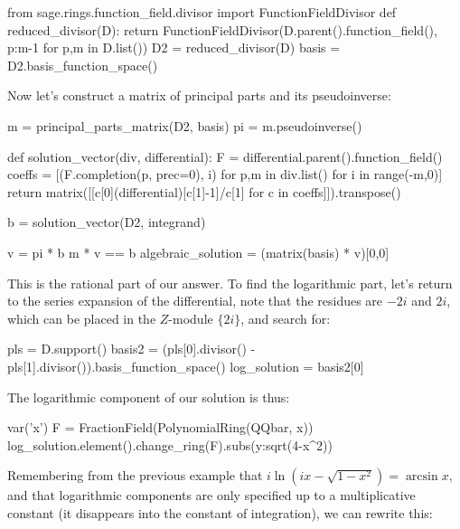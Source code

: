 \begin{sageblock}[ex8.7]
from sage.rings.function_field.divisor import FunctionFieldDivisor
def reduced_divisor(D):
    return FunctionFieldDivisor(D.parent().function_field(),
                                {p:m-1 for p,m in D.list()})
D2 = reduced_divisor(D)
basis = D2.basis_function_space()
\end{sageblock}

Now let's construct a matrix of principal parts
and its pseudoinverse:

\begin{sageblock}[ex8.7]
m = principal_parts_matrix(D2, basis)
pi = m.pseudoinverse()
\end{sageblock}

\begin{sageblock}[ex8.7]
def solution_vector(div, differential):
    F = differential.parent().function_field()
    coeffs = [(F.completion(p, prec=0), i) for p,m in div.list() for i in range(-m,0)]
    return matrix([[c[0](differential)[c[1]-1]/c[1] for c in coeffs]]).transpose()
\end{sageblock}

\begin{sageblock}[ex8.7]
b = solution_vector(D2, integrand)
\end{sageblock}

\begin{sageblock}[ex8.7]
v = pi * b
m * v == b
algebraic_solution = (matrix(basis) * v)[0,0]
\end{sageblock}

This is the rational part of our answer.  To find the logarithmic
part, let's return to the series expansion of the differential,
note that the residues are $-2i$ and $2i$, which can be placed
in the $Z$-module $\{2i\}$, and search for:

\begin{sageblock}[ex8.7]
pls = D.support()
basis2 = (pls[0].divisor() - pls[1].divisor()).basis_function_space()
log_solution = basis2[0]
\end{sageblock}

The logarithmic component of our solution is thus:

\begin{sageblock}[ex8.7]
var('x')
F = FractionField(PolynomialRing(QQbar, x))
log_solution.element().change_ring(F).subs({y:sqrt(4-x^2)})
\end{sageblock}

Remembering from the previous example that $i \ln(ix-\sqrt{1-x^2}) = \arcsin x$,
and that logarithmic components are only specified up
to a multiplicative constant (it disappears into the constant
of integration), we can rewrite this:

